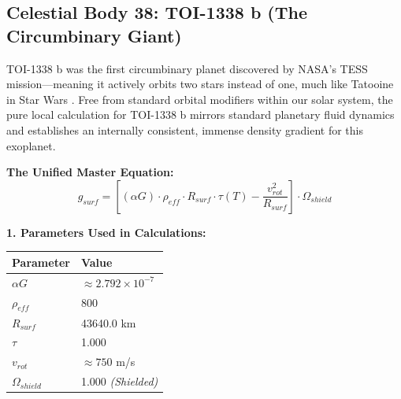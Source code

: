 \documentclass[11pt, a4paper]{article}
\begin{document}
\clearpage
\subsection{Celestial Body 38: TOI-1338 b (The Circumbinary Giant)}
  TOI-1338 b was the first circumbinary planet discovered by NASA's TESS mission---meaning it actively orbits two stars instead of one, much like Tatooine in Star Wars \cite{kostov2020}. Free from standard orbital modifiers within our solar system, the pure local calculation for TOI-1338 b mirrors standard planetary fluid dynamics and establishes an internally consistent, immense density gradient for this exoplanet.

  \vspace{0.5em}
  \noindent \textbf{The Unified Master Equation:}
  $$ g_{surf} = \left[ (\alpha G) \cdot \rho_{eff} \cdot R_{surf} \cdot \tau(T) - \frac{v_{rot}^2}{R_{surf}} \right] \cdot \Omega_{shield} $$

  \vspace{0.5em}
  \noindent \textbf{1. Parameters Used in Calculations:} \\[0.5em]
  \begingroup
  \renewcommand{\arraystretch}{1.3}
  \hspace*{2em}
  \begin{tabular}{|l|l|}
    \hline
    \textbf{Parameter} & \textbf{Value} \\ \hline
    $\alpha G$ & $\approx 2.792 \times 10^{-7}$ \\ \hline
    $\rho_{eff}$ & 800 \\ \hline
    $R_{surf}$ & 43640.0 km \\ \hline
    $\tau$ & 1.000 \\ \hline
    $v_{rot}$ & $\approx 750$ m/s \\ \hline
    $\Omega_{shield}$ & 1.000 \textit{(Shielded)} \\ \hline
  \end{tabular}
  \endgroup
\end{document}
